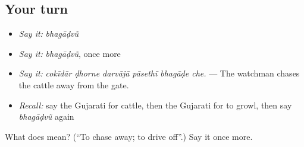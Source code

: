 \subsection*{Your turn}
\begin{itemize}
\raggedright
  \item \emph{Say it:} \emph{bhagāḍvũ}
  \item \emph{Say it:} \emph{bhagāḍvũ}, once more
  \item \emph{Say it:} \emph{cokīdār ḍhorne darvājā pāsethī bhagāḍe che.} — The watchman chases the cattle away from the gate.
  \item \emph{Recall:} say the Gujarati for cattle, then the Gujarati for to growl, then say \emph{bhagāḍvũ} again
\end{itemize}

\begin{tcolorbox}[breakable,colback=teal!4,colframe=teal!35!black,title={Before you move on}]
What does  mean? (\textquotedblleft{}To chase away; to drive off\textquotedblright{}.) Say it once more.
\end{tcolorbox}
